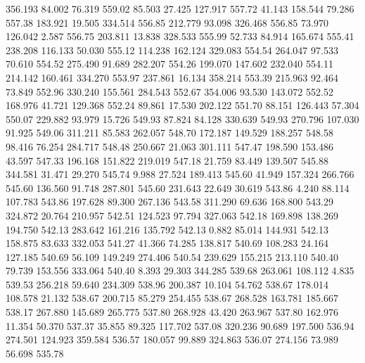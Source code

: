  356.193   84.002   76.319       559.02
  85.503   27.425  127.917       557.72
  41.143  158.544   79.286       557.38
 183.921   19.505  334.514       556.85
 212.779   93.098  326.468       556.85
  73.970  126.042    2.587       556.75
 203.811   13.838  328.533       555.99
  52.733   84.914  165.674       555.41
 238.208  116.133   50.030       555.12
 114.238  162.124  329.083       554.54
 264.047   97.533   70.610       554.52
 275.490   91.689  282.207       554.26
 199.070  147.602  232.040       554.11
 214.142  160.461  334.270       553.97
 237.861   16.134  358.214       553.39
 215.963   92.464   73.849       552.96
 330.240  155.561  284.543       552.67
 354.006   93.530  143.072       552.52
 168.976   41.721  129.368       552.24
  89.861   17.530  202.122       551.70
  88.151  126.443   57.304       550.07
 229.882   93.979   15.726       549.93
  87.824   84.128  330.639       549.93
 270.796  107.030   91.925       549.06
 311.211   85.583  262.057       548.70
 172.187  149.529  188.257       548.58
  98.416   76.254  284.717       548.48
 250.667   21.063  301.111       547.47
 198.590  153.486   43.597       547.33
 196.168  151.822  219.019       547.18
  21.759   83.449  139.507       545.88
 344.581   31.471   29.270       545.74
   9.988   27.524  189.413       545.60
  41.949  157.324  266.766       545.60
 136.560   91.748  287.801       545.60
 231.643   22.649   30.619       543.86
   4.240   88.114  107.783       543.86
 197.628   89.300  267.136       543.58
 311.290   69.636  168.800       543.29
 324.872   20.764  210.957       542.51
 124.523   97.794  327.063       542.18
 169.898  138.269  194.750       542.13
 283.642  161.216  135.792       542.13
   0.882   85.014  144.931       542.13
 158.875   83.633  332.053       541.27
  41.366   74.285  138.817       540.69
 108.283   24.164  127.185       540.69
  56.109  149.249  274.406       540.54
 239.629  155.215  213.110       540.40
  79.739  153.556  333.064       540.40
   8.393   29.303  344.285       539.68
 263.061  108.112    4.835       539.53
 256.218   59.640  234.309       538.96
 200.387   10.104   54.762       538.67
 178.014  108.578   21.132       538.67
 200.715   85.279  254.455       538.67
 268.528  163.781  185.667       538.17
 267.880  145.689  265.775       537.80
 268.928   43.420  263.967       537.80
 162.976   11.354   50.370       537.37
  35.855   89.325  117.702       537.08
 320.236   90.689  197.500       536.94
 274.501  124.923  359.584       536.57
 180.057   99.889  324.863       536.07
 274.156   73.989   56.698       535.78
